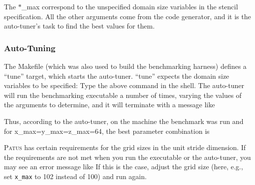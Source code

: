 The $\ast$\_max correspond to the unspecified domain size variables in the stencil specification.
All the other arguments come from the code generator, and it is the auto-tuner's task to find the best values
for them.


\subsubsection{Auto-Tuning}

The Makefile (which was also used to build the benchmarking harness) defines a ``tune'' target, which
starts the auto-tuner. ``tune'' expects the domain size variables to be specified:
Type the above command in the shell. The auto-tuner will run the benchmarking executable a number of times,
varying the values of the arguments to determine, and it will terminate with a message like


\noindent Thus, according to the auto-tuner, on the machine the benchmark was run and for x\_max=y\_max=z\_max=64,
the best parameter combination is 

\textsc{Patus} has certain requirements for the grid sizes in the unit stride dimension.
If the requirements are not met when you run the executable or the auto-tuner, you may see an error message like
If this is the case, adjust the grid size (here, e.g., set \texttt{x\_max} to 102 instead of 100) and run again.


